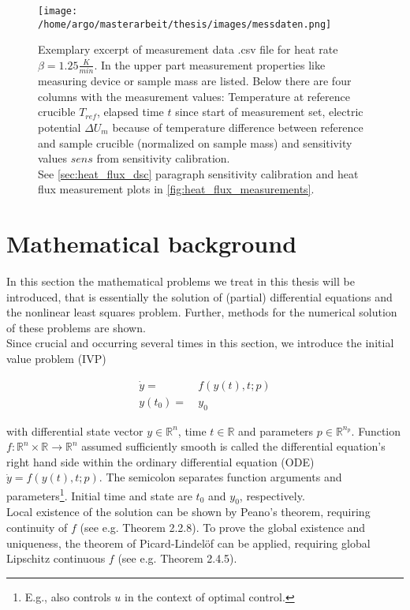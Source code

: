 \documentclass{scrartcl}[12pt, halfparskip]
\numberwithin{equation}{section}
\numberwithin{figure}{section}
\numberwithin{table}{section}
\begin{document}
\begin{figure}[H]
	\centering
	\texttt{[image: /home/argo/masterarbeit/thesis/images/messdaten.png]}
	\caption{Exemplary excerpt of measurement data .csv file for heat rate $\beta=1.25 \frac{K}{min}$. In the upper part measurement properties like measuring device or sample mass are listed. Below there are four columns with the measurement values: Temperature at reference crucible $T_{ref}$, elapsed time $t$ since start of measurement set, electric potential $\Delta U_m$ because of temperature difference between reference and sample crucible (normalized on sample mass) and sensitivity values $sens$ from sensitivity calibration. \\
		See \cref{sec:heat_flux_dsc} paragraph sensitivity calibration and heat flux measurement plots in \cref{fig:heat_flux_measurements}.}
	\label{fig:measurement_csv_data}
\end{figure}








\newpage
\section{Mathematical background}
\label{sec:mathematical_background}

In this section the mathematical problems we treat in this thesis will be introduced, that is essentially the solution of (partial) differential equations and the nonlinear least squares problem. Further, methods for the numerical solution of these problems are shown. \\

Since crucial and occurring several times in this section, we introduce the initial value problem (IVP)

\begin{align}
	\dot{y} = & \ f(y(t), t; p) \label{eq:initial_value_problem_definition} \\
	y(t_0) = & \ y_0 \nonumber
\end{align}

with differential state vector $y \in \mathbb{R}^n$, time $t \in \mathbb{R}$ and parameters $p \in \mathbb{R}^{n_p}$. Function $f: \mathbb{R}^n \times \mathbb{R} \rightarrow \mathbb{R}^n$ assumed sufficiently smooth is called the differential equation's right hand side within the ordinary differential equation (ODE) $\dot{y} = f(y(t), t; p)$. The semicolon separates function arguments and  parameters\footnote{E.g., also controls $u$ in the context of optimal control.}. Initial time and state are $t_0$ and $y_0$, respectively. \\
Local existence of the solution can be shown by Peano's theorem, requiring continuity of $f$ (see e.g. \cite{ODE_analytic} Theorem 2.2.8).
To prove the global existence and uniqueness, the theorem of Picard-Lindelöf can be applied, requiring global Lipschitz continuous $f$ (see e.g. \cite{ODE_analytic} Theorem 2.4.5). \\
\end{document}
